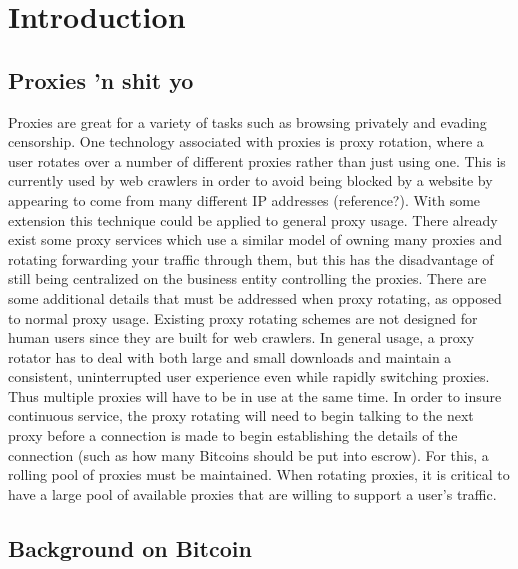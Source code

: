 \section{Introduction}
\label{sec:intro}

\subsection{Proxies 'n shit yo}

Proxies are great for a variety of tasks such as browsing privately and evading censorship. One technology associated with proxies is proxy rotation, where a user rotates over a number of different proxies rather than just using one. This is currently used by web crawlers in order to avoid being blocked by a website by appearing to come from many different IP addresses (reference?). With some extension this technique could be applied to general proxy usage. There already exist some proxy services which use a similar model of owning many proxies and rotating forwarding your traffic through them, but this has the disadvantage of still being centralized on the business entity controlling the proxies. There are some additional details that must be addressed when proxy rotating, as opposed to normal proxy usage. Existing proxy rotating schemes are not designed for human users since they are built for web crawlers. In general usage, a proxy rotator has to deal with both large and small downloads and maintain a consistent, uninterrupted user experience even while rapidly switching proxies. Thus multiple proxies will have to be in use at the same time. In order to insure continuous service, the proxy rotating will need to begin talking to the next proxy before a connection is made to begin establishing the details of the connection (such as how many Bitcoins should be put into escrow). For this, a rolling pool of proxies must be maintained. When rotating proxies, it is critical to have a large pool of available proxies that are willing to support a user's traffic.

\subsection{Background on Bitcoin}

